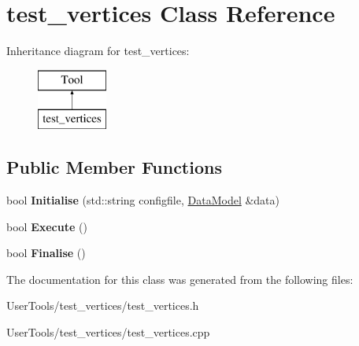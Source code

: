\hypertarget{classtest__vertices}{\section{test\-\_\-vertices Class Reference}
\label{classtest__vertices}
}
Inheritance diagram for test\-\_\-vertices\-:\begin{figure}[H]
\begin{center}
\leavevmode
\includegraphics[height=2.000000cm]{classtest__vertices}
\end{center}
\end{figure}
\subsection*{Public Member Functions}
\begin{DoxyCompactItemize}
\item 
\hypertarget{classtest__vertices_a2f1df4bbd24e004cc0bd842d965d790c}{bool {\bfseries Initialise} (std\-::string configfile, \hyperlink{classDataModel}{Data\-Model} \&data)}\label{classtest__vertices_a2f1df4bbd24e004cc0bd842d965d790c}

\item 
\hypertarget{classtest__vertices_ae821e1dfadb82459b0dd2e5ff18075d4}{bool {\bfseries Execute} ()}\label{classtest__vertices_ae821e1dfadb82459b0dd2e5ff18075d4}

\item 
\hypertarget{classtest__vertices_abbb346ad381838ee3dcc9c294ca34c75}{bool {\bfseries Finalise} ()}\label{classtest__vertices_abbb346ad381838ee3dcc9c294ca34c75}

\end{DoxyCompactItemize}


The documentation for this class was generated from the following files\-:\begin{DoxyCompactItemize}
\item 
User\-Tools/test\-\_\-vertices/test\-\_\-vertices.\-h\item 
User\-Tools/test\-\_\-vertices/test\-\_\-vertices.\-cpp\end{DoxyCompactItemize}
